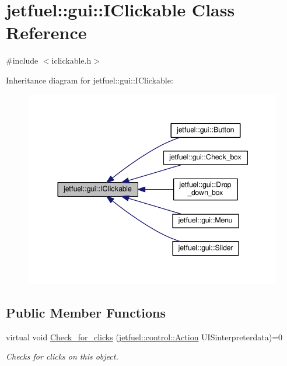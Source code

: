 \hypertarget{classjetfuel_1_1gui_1_1IClickable}{}\section{jetfuel\+:\+:gui\+:\+:I\+Clickable Class Reference}
\label{classjetfuel_1_1gui_1_1IClickable}


{\ttfamily \#include $<$iclickable.\+h$>$}



Inheritance diagram for jetfuel\+:\+:gui\+:\+:I\+Clickable\+:\nopagebreak
\begin{figure}[H]
\begin{center}
\leavevmode
\includegraphics[width=344pt]{classjetfuel_1_1gui_1_1IClickable__inherit__graph}
\end{center}
\end{figure}
\subsection*{Public Member Functions}
\begin{DoxyCompactItemize}
\item 
virtual void \hyperlink{classjetfuel_1_1gui_1_1IClickable_aea45de37bd3beb7eb7e2e3056e4e37b3}{Check\+\_\+for\+\_\+clicks} (\hyperlink{structjetfuel_1_1control_1_1Action}{jetfuel\+::control\+::\+Action} U\+I\+Sinterpreterdata)=0
\begin{DoxyCompactList}\small\item\em Checks for clicks on this object. \end{DoxyCompactList}\end{DoxyCompactItemize}


